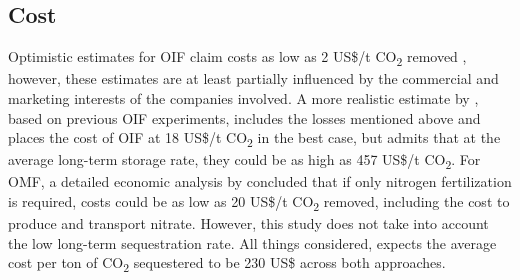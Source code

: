 \subsection*{Cost}
Optimistic estimates for OIF claim costs as low as 2 US\$/t CO\textsubscript{2} removed \parencite{Fuentes-George2017ConsensusFertilization}, however, these estimates are at least partially influenced by the commercial and marketing interests of the companies involved. A more realistic estimate by \textcite{Harrison2013AOcean}, based on previous OIF experiments, includes the losses mentioned above and places the cost of OIF at 18 US\$/t CO\textsubscript{2} in the best case, but admits that at the average long-term storage rate, they could be as high as 457 US\$/t CO\textsubscript{2}.
For OMF, a detailed economic analysis by \textcite{S.F.Jones2014TheNourishment} concluded that if only nitrogen fertilization is required, costs could be as low as 20 US\$/t CO\textsubscript{2} removed, including the cost to produce and transport nitrate. However, this study does not take into account the low long-term sequestration rate.
All things considered, \textcite{Gattuso2021TheBeyond} expects the average cost per ton of CO\textsubscript{2} sequestered to be 230 US\$ across both approaches.
